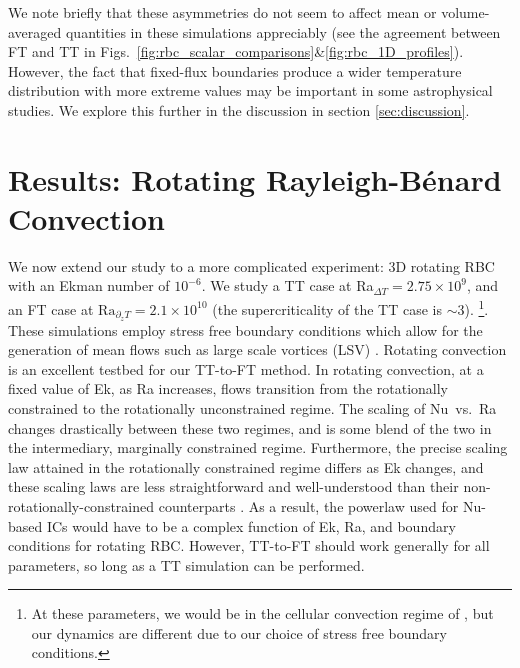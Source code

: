\documentclass[aps, pre, onecolumn, nofootinbib, notitlepage, groupedaddress, amsfonts, amssymb, amsmath, longbibliography, superscriptaddress]{revtex4-1}
\newcommand{\RB}{Rayleigh-B\'{e}nard }
\newcommand{\ea}[1]{{\color{red} #1}}
\begin{document}
We note briefly that these asymmetries do not seem to affect mean or volume-averaged quantities in these simulations appreciably (see the agreement between FT and TT in Figs.~\ref{fig:rbc_scalar_comparisons}\&\ref{fig:rbc_1D_profiles}).
However, the fact that fixed-flux boundaries produce a wider temperature distribution with more extreme values may be important in some astrophysical studies.
We explore this further in the discussion in section \ref{sec:discussion}.





\section{Results: Rotating \RB Convection}
\label{sec:results_rotating}

We now extend our study to a more complicated experiment: 3D rotating RBC with an Ekman number of $10^{-6}$.
We study a TT case at Ra$_{\Delta T} = 2.75\times 10^9$, and an FT case at $\text{Ra}_{\partial_z T} = 2.1 \times 10^{10}$ (the supercriticality of the TT case is $\sim 3$).
\footnote{\ea{At these parameters, we would be in the cellular convection regime of \citet{stellmach&all2014}, but our dynamics are different due to our choice of stress free boundary conditions.
}}.
These simulations employ stress free boundary conditions which allow for the generation of mean flows such as large scale vortices (LSV) \ea{\citep{stellmach&all2014, rubio&all2014, guervilly&all2014, guervilly&hughes2017, favier&all2014, favier&all2019, couston&all2019}}.
\ea{
Rotating convection is an excellent testbed for our TT-to-FT method.
In rotating convection, at a fixed value of Ek, as Ra increases, flows transition from the rotationally constrained to the rotationally unconstrained regime.
The scaling of Nu~vs.~Ra changes drastically between these two regimes, and is some blend of the two in the intermediary, marginally constrained regime.
Furthermore, the precise scaling law attained in the rotationally constrained regime differs as Ek changes, and these scaling laws are less straightforward and well-understood than their non-rotationally-constrained counterparts \cite{king&all2009, schmitz&tilgner2009, zhong&ahlers2010, julien&all2012, stevens&all2013, ecke2015, grooms2015, grooms&whitehead2015,  plumley&julien2019}.
As a result, the powerlaw used for Nu-based ICs would have to be a complex function of Ek, Ra, and boundary conditions for rotating RBC.
However, TT-to-FT should work generally for all parameters, so long as a TT simulation can be performed.
}
\end{document}

